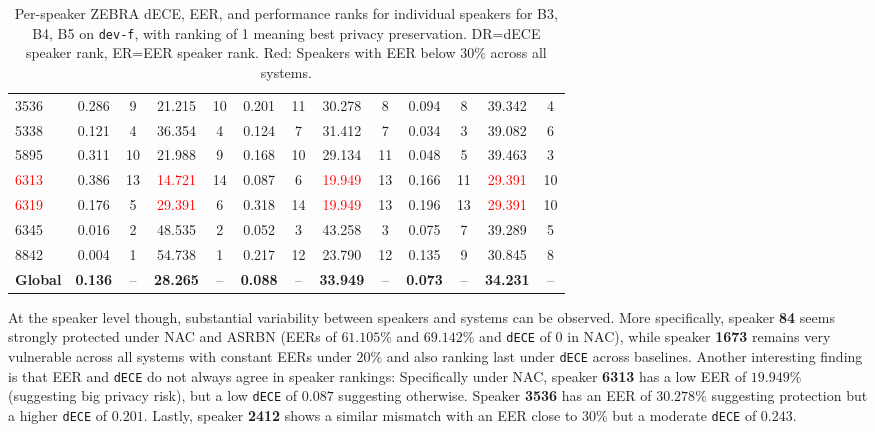 \documentclass[12pt,leqno,a4paper]{article}
\begin{document}
\begin{table}[H]
\begin{tabular}{lcccccccccccc}
3536 & 0.286 & 9  & 21.215 & 10 & 0.201 & 11 & 30.278 & 8  
     & 0.094 & 8  & 39.342 & 4  \\
5338 & 0.121 & 4  & 36.354 & 4  & 0.124 & 7  & 31.412 & 7  
     & 0.034 & 3  & 39.082 & 6  \\
5895 & 0.311 & 10 & 21.988 & 9  & 0.168 & 10 & 29.134 & 11 
     & 0.048 & 5  & 39.463 & 3  \\
\textcolor{red}{6313} 
     & 0.386 & 13 & \textcolor{red}{14.721} & 14 
     & 0.087 & 6  & \textcolor{red}{19.949} & 13 
     & 0.166 & 11 & \textcolor{red}{29.391} & 10 \\
\textcolor{red}{6319} 
     & 0.176 & 5  & \textcolor{red}{29.391} & 6  
     & 0.318 & 14 & \textcolor{red}{19.949} & 13 
     & 0.196 & 13 & \textcolor{red}{29.391} & 10 \\
6345 & 0.016 & 2  & 48.535 & 2  & 0.052 & 3  & 43.258 & 3  
     & 0.075 & 7  & 39.289 & 5  \\
8842 & 0.004 & 1  & 54.738 & 1  & 0.217 & 12 & 23.790 & 12 
     & 0.135 & 9  & 30.845 & 8  \\
\midrule
\textbf{Global}
& \textbf{0.136} & -- & \textbf{28.265} & --
& \textbf{0.088} & -- & \textbf{33.949} & --
& \textbf{0.073} & -- & \textbf{34.231} & -- \\
\bottomrule
\end{tabular}
\caption{Per-speaker ZEBRA dECE, EER, and performance ranks for individual speakers for B3, B4, B5 on \texttt{dev-f}, with ranking of 1 meaning best privacy preservation. DR=dECE speaker rank, ER=EER speaker rank. Red: Speakers with EER below $30\%$ across all systems.}
\label{tab:dev_f_zebra_eer_ranks}
\end{table}

At the speaker level though, substantial variability between speakers and systems can be observed. More specifically, speaker \textbf{84} seems strongly protected under NAC and ASRBN (EERs of $61.105\%$ and $69.142\%$ and \texttt{dECE} of $0$ in NAC), while speaker \textbf{1673} remains very vulnerable across all systems with constant EERs under $20\%$ and also ranking last under \texttt{dECE} across baselines. Another interesting finding is that EER and \texttt{dECE} do not always agree in speaker rankings: Specifically under NAC, speaker \textbf{6313} has a low EER of $19.949\%$ (suggesting big privacy risk), but a low \texttt{dECE} of $0.087$ suggesting otherwise. Speaker \textbf{3536} has an EER of $30.278\%$ suggesting protection but a higher \texttt{dECE} of $0.201$. Lastly, speaker \textbf{2412} shows a similar mismatch with an EER close to $30\%$ but a moderate \texttt{dECE} of $0.243$.
\end{document}
